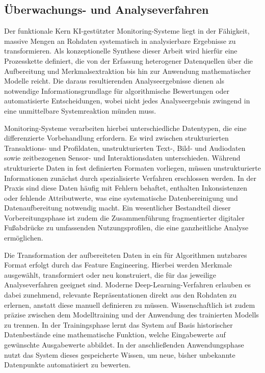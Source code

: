 \subsection{Überwachungs- und Analyseverfahren}

Der funktionale Kern \ac{KI}-gestützter Monitoring-Systeme liegt in der Fähigkeit, massive Mengen an Rohdaten systematisch in analysierbare Ergebnisse zu transformieren. Als konzeptionelle Synthese dieser Arbeit wird hierfür eine Prozesskette definiert, die von der Erfassung heterogener Datenquellen über die Aufbereitung und Merkmalsextraktion bis hin zur Anwendung mathematischer Modelle reicht. Die daraus resultierenden Analyseergebnisse dienen als notwendige Informationsgrundlage für algorithmische Bewertungen oder automatisierte Entscheidungen, wobei nicht jedes Analyseergebnis zwingend in eine unmittelbare Systemreaktion münden muss.

Monitoring-Systeme verarbeiten hierbei unterschiedliche Datentypen, die eine differenzierte Vorbehandlung erfordern. Es wird zwischen strukturierten Transaktions- und Profildaten, unstrukturierten Text-, Bild- und Audiodaten sowie zeitbezogenen Sensor- und Interaktionsdaten unterschieden. Während strukturierte Daten in fest definierten Formaten vorliegen, müssen unstrukturierte Informationen zunächst durch spezialisierte Verfahren erschlossen werden. In der Praxis sind diese Daten häufig mit Fehlern behaftet, enthalten Inkonsistenzen oder fehlende Attributwerte, was eine systematische Datenbereinigung und Datenaufbereitung notwendig macht. Ein wesentlicher Bestandteil dieser Vorbereitungsphase ist zudem die Zusammenführung fragmentierter digitaler Fußabdrücke zu umfassenden Nutzungsprofilen, die eine ganzheitliche Analyse ermöglichen.

Die Transformation der aufbereiteten Daten in ein für Algorithmen nutzbares Format erfolgt durch das Feature Engineering. Hierbei werden Merkmale ausgewählt, transformiert oder neu konstruiert, die für das jeweilige Analyseverfahren geeignet sind. Moderne Deep-Learning-Verfahren erlauben es dabei zunehmend, relevante Repräsentationen direkt aus den Rohdaten zu erlernen, anstatt diese manuell definieren zu müssen. Wissenschaftlich ist zudem präzise zwischen dem Modelltraining und der Anwendung des trainierten Modells zu trennen. In der Trainingsphase lernt das System auf Basis historischer Datenbestände eine mathematische Funktion, welche Eingabewerte auf gewünschte Ausgabewerte abbildet. In der anschließenden Anwendungsphase nutzt das System dieses gespeicherte Wissen, um neue, bisher unbekannte Datenpunkte automatisiert zu bewerten.

